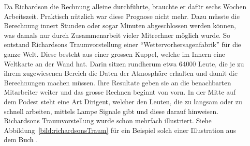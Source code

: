 Da Richardson die Rechnung alleine durchführte, brauchte er dafür sechs Wochen Arbeitszeit. 
Praktisch nützlich war diese Prognose nicht mehr.
Dazu müsste die Berechnung innert Stunden oder sogar Minuten abgeschlossen werden können, was damals nur durch Zusammenarbeit vieler Mitrechner möglich wurde. 
So entstand Richardsons Traumvorstellung einer ``Wettervorhersagenfabrik'' für die ganze Welt.
%
Diese besteht aus einer grossen Kuppel, welche im Innern eine Weltkarte an der Wand hat. 
Darin sitzen rundherum etwa 64000 Leute, die je zu ihrem zugewiesenen Bereich die Daten der Atmosphäre erhalten und damit die Berechnungen machen müssen. 
Ihre Resultate geben sie an die benachbarten Mitarbeiter weiter und das grosse Rechnen beginnt von vorn. 
In der Mitte auf dem Podest steht eine Art \glqq Dirigent\grqq, welcher den Leuten, die zu langsam oder zu schnell arbeiten, mittels Lampe Signale gibt und diese darauf hinweisen.
Richardsons Traumvorstellung wurde schon mehrfach illustriert.
Siehe Abbildung~\ref{bild:richardsonsTraum} für ein Beispiel solch einer Illustration aus dem Buch \cite{geostrophisch:richardsonsDream}.

